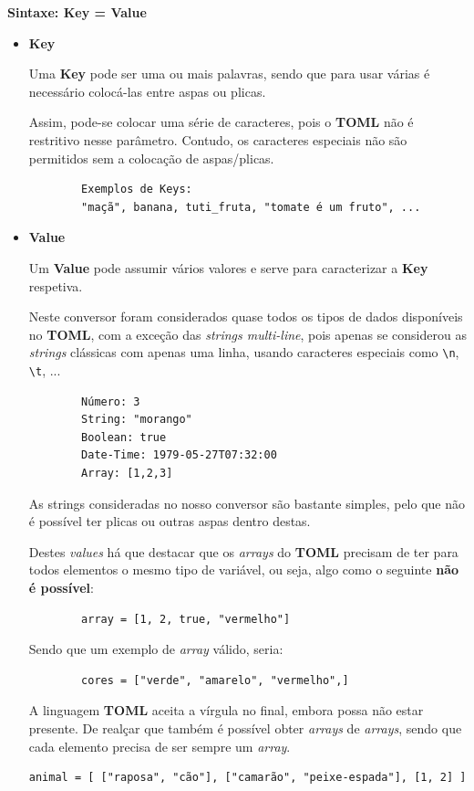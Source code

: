 \documentclass[a4paper,12pt]{report}
\newcommand*{\escape}[1]{\texttt{\textbackslash#1}}
\begin{document}
\vspace{0.5cm}

\par \textbf{Sintaxe: Key = Value}

\vspace{0.3cm}

\begin{itemize}
    \item \textbf{Key}
    \par Uma \textbf{Key} pode ser uma ou mais palavras, sendo que para usar várias é necessário colocá-las entre aspas ou plicas.
    \par Assim, pode-se colocar uma série de caracteres, pois o \textbf{TOML} não é restritivo nesse parâmetro. Contudo, os caracteres especiais não são permitidos sem a colocação de aspas/plicas.
    \begin{verbatim}
        Exemplos de Keys:
        "maçã", banana, tuti_fruta, "tomate é um fruto", ...
    \end{verbatim}
    \item \textbf{Value}
    \par Um \textbf{Value} pode assumir vários valores e serve para caracterizar a \textbf{Key} respetiva. 
    \par Neste conversor foram considerados quase todos os tipos de dados disponíveis no \textbf{TOML}, com a exceção das \textit{strings multi-line}, pois apenas se considerou as \textit{strings} clássicas com apenas uma linha, usando caracteres especiais como \escape{n}, \escape{t}, ...
    \begin{verbatim}
        Número: 3
        String: "morango"
        Boolean: true
        Date-Time: 1979-05-27T07:32:00
        Array: [1,2,3]
    \end{verbatim}
    \par As strings consideradas no nosso conversor são bastante simples, pelo que não é possível ter plicas ou outras aspas dentro destas.
    \par Destes \textit{values} há que destacar que os \textit{arrays} do \textbf{TOML} precisam de ter para todos elementos o mesmo tipo de variável, ou seja, algo como o seguinte \textbf{não é possível}:
    \begin{verbatim}
        array = [1, 2, true, "vermelho"]
    \end{verbatim}
    Sendo que um exemplo de \textit{array} válido, seria:
    \begin{verbatim}
        cores = ["verde", "amarelo", "vermelho",]
    \end{verbatim}
    A linguagem \textbf{TOML} aceita a vírgula no final, embora possa não estar presente. De realçar que também é possível obter \textit{arrays} de \textit{arrays}, sendo que cada elemento precisa de ser sempre um \textit{array}.
    \begin{verbatim}
animal = [ ["raposa", "cão"], ["camarão", "peixe-espada"], [1, 2] ]
    \end{verbatim}  
    
\end{itemize}  
\end{document}
